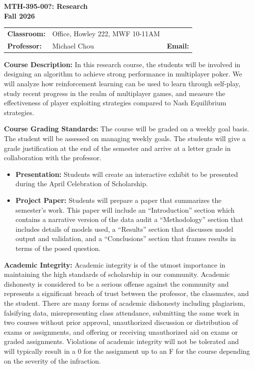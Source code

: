 \documentclass[12pt]{article}
\begin{document}
{\noindent \bf MTH-395-00?: Research} \\
{\noindent \bf Fall 2026}
\medskip

\begin{tabular}{lll}
{\bf Classroom:} & Office, Howley 222, MWF 10-11AM &\\
{\bf Professor:} & Michael Chou & {\bf Email:}\;\; \verb0mchou@providence.edu0 \\
\end{tabular}
\smallskip

{\bf \noindent Course Description:} In this research course, the students will be involved in designing an algorithm to achieve strong performance in multiplayer poker. We will analyze how reinforcement learning can be used to learn through self-play, study recent progress in the realm of multiplayer games, and measure the effectiveness of player exploiting strategies compared to Nash Equilibrium strategies.

\medskip

{\bf \noindent Course Grading Standards:} The course will be graded on a weekly goal basis. The student will be assessed on managing weekly goals. The students will give a grade justification at the end of the semester and arrive at a letter grade in collaboration with the professor.

\begin{itemize}

\item \textbf{Presentation:} Students will create an interactive exhibit to be presented during the April Celebration of Scholarship.

\item \textbf{Project Paper:} Students will prepare a paper that summarizes the semester's work. This paper will include an ``Introduction'' section which contains a narrative version of the data audit a ``Methodology'' section that includes details of models used, a ``Results'' section that discusses model output and validation, and a ``Conclusions'' section that frames results in terms of the posed question.

\end{itemize}


\medskip

{\bf \noindent Academic Integrity:}  Academic integrity is of the utmost importance in maintaining the high standards of scholarship in our community. Academic dishonesty is considered to be a serious offense against the community and represents a significant breach of trust between the professor, the classmates, and the student. There are many forms of academic dishonesty including plagiarism, falsifying data, misrepresenting class attendance, submitting the same work in two courses without prior approval, unauthorized discussion or distribution of exams or assignments, and offering or receiving unauthorized aid on exams or graded assignments. Violations of academic integrity will not be tolerated and will typically result in a 0 for the assignment up to an F for the course depending on the severity of the infraction.
 
\end{document}
